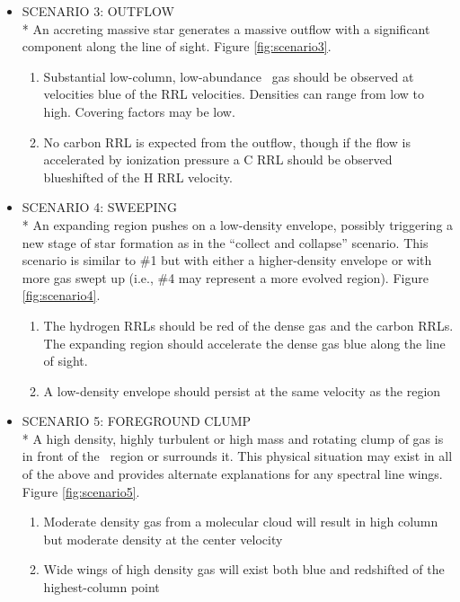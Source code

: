 \begin{itemize}
  \item SCENARIO 3: OUTFLOW
      \\* An accreting massive star generates a massive outflow with
    a significant component along the line of sight. Figure \ref{fig:scenario3}.

  \begin{enumerate}
    \item Substantial low-column, low-abundance \perkms\ gas should be observed
      at velocities blue of the RRL velocities.  Densities can range from low
      to high.  Covering factors may be low.
    \item No carbon RRL is expected from the outflow, though if the flow is
      accelerated by ionization pressure a C RRL should be observed blueshifted of
      the H RRL velocity.
\end{enumerate}


\item SCENARIO 4: SWEEPING
    \\* An expanding  region pushes on a low-density
  envelope, possibly triggering a new stage of star formation as in the ``collect and
  collapse'' scenario.  This scenario is similar to \#1 but with either a
  higher-density envelope or with more gas swept up (i.e., \#4 may represent
  a more evolved region).  Figure \ref{fig:scenario4}.

  \begin{enumerate}
    \item The hydrogen RRLs should be red of the dense gas and the carbon
      RRLs.  The expanding  region should accelerate the dense gas
      blue along the line of sight.
    \item A low-density envelope should persist at the same velocity as the
       region
\end{enumerate}

\item SCENARIO 5: FOREGROUND CLUMP
    \\* A high density, highly turbulent or high mass and rotating clump of gas
  is in front of the \uchii\ region or surrounds it.  This physical situation may exist
  in all of the above and provides alternate explanations for any spectral line wings.  Figure \ref{fig:scenario5}.
  \begin{enumerate}
    \item Moderate density gas from a molecular cloud will result in high
      column but moderate density at the center velocity
    \item Wide wings of high density gas will exist both blue and redshifted of
      the highest-column point
  \end{enumerate}

\end{itemize}


